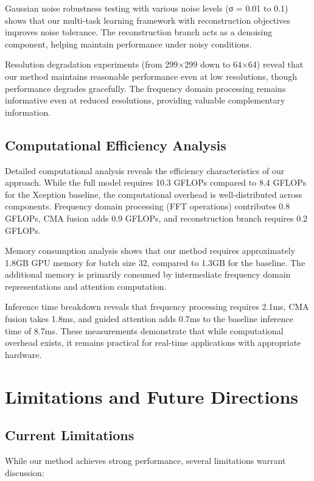 \documentclass[letterpaper]{article} %
\begin{document}
Gaussian noise robustness testing with various noise levels (σ = 0.01 to 0.1) shows that our multi-task learning framework with reconstruction objectives improves noise tolerance. The reconstruction branch acts as a denoising component, helping maintain performance under noisy conditions.

Resolution degradation experiments (from 299×299 down to 64×64) reveal that our method maintains reasonable performance even at low resolutions, though performance degrades gracefully. The frequency domain processing remains informative even at reduced resolutions, providing valuable complementary information.

\subsection{Computational Efficiency Analysis}

Detailed computational analysis reveals the efficiency characteristics of our approach. While the full model requires 10.3 GFLOPs compared to 8.4 GFLOPs for the Xception baseline, the computational overhead is well-distributed across components. Frequency domain processing (FFT operations) contributes 0.8 GFLOPs, CMA fusion adds 0.9 GFLOPs, and reconstruction branch requires 0.2 GFLOPs.

Memory consumption analysis shows that our method requires approximately 1.8GB GPU memory for batch size 32, compared to 1.3GB for the baseline. The additional memory is primarily consumed by intermediate frequency domain representations and attention computation.

Inference time breakdown reveals that frequency processing requires 2.1ms, CMA fusion takes 1.8ms, and guided attention adds 0.7ms to the baseline inference time of 8.7ms. These measurements demonstrate that while computational overhead exists, it remains practical for real-time applications with appropriate hardware.

\section{Limitations and Future Directions}

\subsection{Current Limitations}

While our method achieves strong performance, several limitations warrant discussion:
\end{document}
